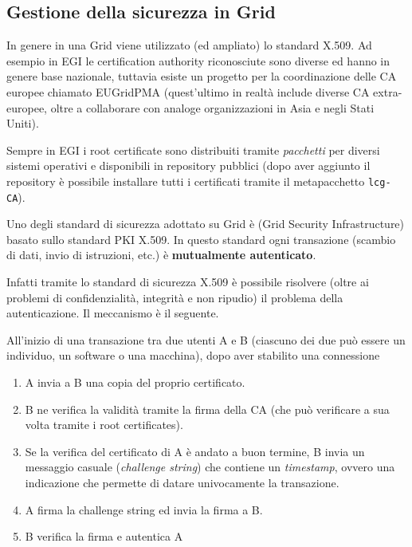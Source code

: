 \documentclass[italian,]{article}
\providecommand{\tightlist}{%
  \setlength{\itemsep}{0pt}\setlength{\parskip}{0pt}}
\begin{document}
\subsection{Gestione della sicurezza in
Grid}\label{gestione-della-sicurezza-in-grid}

In genere in una Grid viene utilizzato (ed ampliato) lo standard X.509.
Ad esempio in EGI le certification authority riconosciute sono diverse
ed hanno in genere base nazionale, tuttavia esiste un progetto per la
coordinazione delle CA europee chiamato EUGridPMA (quest'ultimo in
realtà include diverse CA extra-europee, oltre a collaborare con analoge
organizzazioni in Asia e negli Stati Uniti).

Sempre in EGI i root certificate sono distribuiti tramite
\emph{pacchetti} per diversi sistemi operativi e disponibili in
repository pubblici (dopo aver aggiunto il repository è possibile
installare tutti i certificati tramite il metapacchetto
\texttt{lcg-CA}).

Uno degli standard di sicurezza adottato su Grid è (Grid Security
Infrastructure) basato sullo standard PKI X.509. In questo standard ogni
transazione (scambio di dati, invio di istruzioni, etc.) è
\textbf{mutualmente autenticato}.

Infatti tramite lo standard di sicurezza X.509 è possibile risolvere
(oltre ai problemi di confidenzialità, integrità e non ripudio) il
problema della autenticazione. Il meccanismo è il seguente.

All'inizio di una transazione tra due utenti A e B (ciascuno dei due può
essere un individuo, un software o una macchina), dopo aver stabilito
una connessione

\begin{enumerate}
\def\labelenumi{\arabic{enumi}.}
\tightlist
\item
  A invia a B una copia del proprio certificato.
\item
  B ne verifica la validità tramite la firma della CA (che può
  verificare a sua volta tramite i root certificates).
\item
  Se la verifica del certificato di A è andato a buon termine, B invia
  un messaggio casuale (\emph{challenge string}) che contiene un
  \emph{timestamp}, ovvero una indicazione che permette di datare
  univocamente la transazione.
\item
  A firma la challenge string ed invia la firma a B.
\item
  B verifica la firma e autentica A
\end{enumerate}
\end{document}
